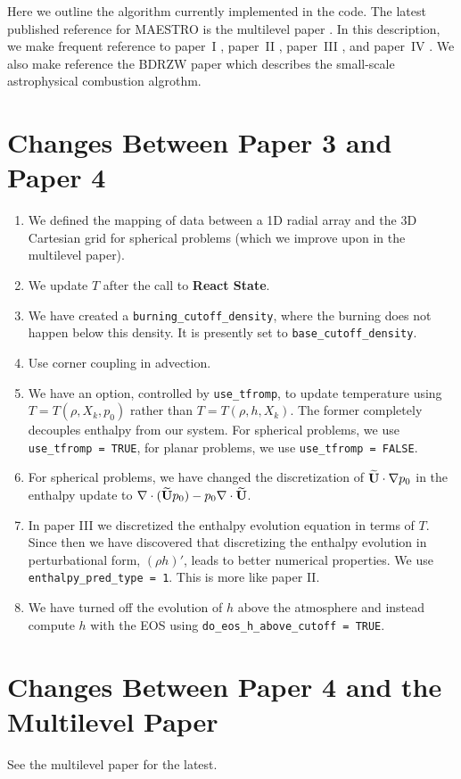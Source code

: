 Here we outline the algorithm currently implemented in the code.  The latest
published reference for MAESTRO is the multilevel paper \cite{multilevel}.  In
this description, we make frequent reference to paper~I \cite{lowMach}, paper~II \cite{lowMach2},
paper~III \cite{lowMach3}, and paper~IV \cite{lowMach4}.  We also make reference the BDRZW paper \cite{SNe}
which describes the small-scale astrophysical combustion algrothm.



\section{Changes Between Paper 3 and Paper 4}
\begin{enumerate}
\item We defined the mapping of data between a 1D radial array and the 3D Cartesian
grid for spherical problems (which we improve upon in the multilevel paper).
\item We update $T$ after the call to {\bf React State}.
\item We have created a {\tt burning\_cutoff\_density}, where the burning does
not happen below this density.  It is presently set to {\tt base\_cutoff\_density}.
\item Use corner coupling in advection.
\item We have an option, controlled by {\tt use\_tfromp}, to update temperature 
using $T=T(\rho,X_k,p_0)$ rather than $T=T(\rho,h,X_k)$.  The former completely 
decouples enthalpy from our system.  For spherical problems, we use 
{\tt use\_tfromp = TRUE}, for planar problems, we use {\tt use\_tfromp = FALSE}.
\item For spherical problems, we have changed the discretization of 
$\widetilde{{\bf U}}\cdot\nabla p_0$ in the enthalpy update to 
$\nabla\cdot(\widetilde{{\bf U}} p_0) - p_0\nabla\cdot\widetilde{{\bf U}}$.
\item In paper III we discretized the enthalpy evolution equation in
terms of $T$.  Since then we have discovered that 
discretizing the enthalpy evolution in perturbational form, $(\rho h)'$,
leads to better numerical properties.  We use {\tt enthalpy\_pred\_type = 1}.
This is more like paper II.
\item We have turned off the evolution of $h$ above the atmosphere and instead
compute $h$ with the EOS using {\tt do\_eos\_h\_above\_cutoff = TRUE}.
\end{enumerate}
\section{Changes Between Paper 4 and the Multilevel Paper}
See the multilevel paper for the latest.
